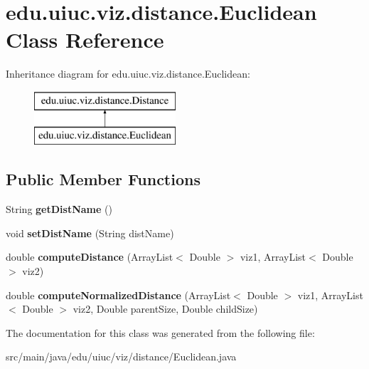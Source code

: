 \hypertarget{classedu_1_1uiuc_1_1viz_1_1distance_1_1_euclidean}{}\section{edu.\+uiuc.\+viz.\+distance.\+Euclidean Class Reference}
\label{classedu_1_1uiuc_1_1viz_1_1distance_1_1_euclidean}
Inheritance diagram for edu.\+uiuc.\+viz.\+distance.\+Euclidean\+:\begin{figure}[H]
\begin{center}
\leavevmode
\includegraphics[height=2.000000cm]{classedu_1_1uiuc_1_1viz_1_1distance_1_1_euclidean}
\end{center}
\end{figure}
\subsection*{Public Member Functions}
\begin{DoxyCompactItemize}
\item 
\mbox{\label{classedu_1_1uiuc_1_1viz_1_1distance_1_1_euclidean_ac8bb5ab17913cf71bf153eeb512dc5e7}} 
String {\bfseries get\+Dist\+Name} ()
\item 
\mbox{\label{classedu_1_1uiuc_1_1viz_1_1distance_1_1_euclidean_abdcc4f871358d2ecd6105bf35b5b500b}} 
void {\bfseries set\+Dist\+Name} (String dist\+Name)
\item 
\mbox{\label{classedu_1_1uiuc_1_1viz_1_1distance_1_1_euclidean_aa06f642d63f85f2ade06b7d97ab7da5a}} 
double {\bfseries compute\+Distance} (Array\+List$<$ Double $>$ viz1, Array\+List$<$ Double $>$ viz2)
\item 
\mbox{\label{classedu_1_1uiuc_1_1viz_1_1distance_1_1_euclidean_abaaf0e2581168930177833e681db4fd5}} 
double {\bfseries compute\+Normalized\+Distance} (Array\+List$<$ Double $>$ viz1, Array\+List$<$ Double $>$ viz2, Double parent\+Size, Double child\+Size)
\end{DoxyCompactItemize}


The documentation for this class was generated from the following file\+:\begin{DoxyCompactItemize}
\item 
src/main/java/edu/uiuc/viz/distance/Euclidean.\+java\end{DoxyCompactItemize}
